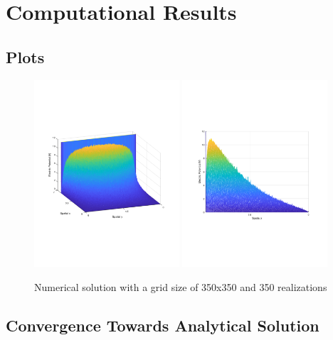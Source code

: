 \documentclass{amsart}
\begin{document}
\section{Computational Results}

\subsection{Plots}

\begin{figure}[H]
	\caption{Numerical solution with a grid size of 350x350 and 350 realizations}
	\label{finalsolution}
	\includegraphics[width=0.48\textwidth]{solution_Dec11_9hrs_isoview.pdf}
	\includegraphics[width=0.48\textwidth]{solution_Dec11_9hrs_sideview.pdf}
\end{figure}

\subsection{Convergence Towards Analytical Solution}
\end{document}
